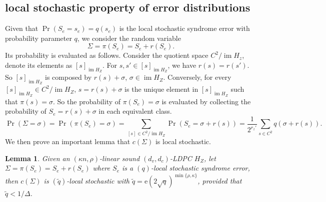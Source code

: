 \documentclass[twoside,english,aps,showpacs,pra,superscriptaddress]{revtex4-2}
\newcommand{\e}{\mathrm{e}}
\DeclareMathOperator{\im}{im}
\newtheorem{lemma}{Lemma}
\begin{document}
\subsection{local stochastic property of error distributions}
Given that $\Pr(S_e=s_e)=q(s_e)$ is the local stochastic syndrome error with probability parameter $q$, we consider the random variable 
\begin{equation}
    \Sigma = \pi(S_e) = S_e + r(S_e). 
\end{equation}
Its probability is evaluated as follows. Consider the quotient space $C^2/\im H_z$, denote its elements as $[s]_{\im H_Z}$. For $s,s' \in [s]_{\im H_Z}$, we have $r(s) = r(s')$.
So $[s]_{\im H_Z}$ is composed by $r(s) +\sigma$, $\sigma\in \im H_Z$. 
Conversely, for every $[s]_{\im H_Z} \in C^2/\im H_Z$, $s = r(s) +\sigma$ is the unique element in $[s]_{\im H_Z}$ such that $\pi(s) = \sigma$.
So the probability of $\pi(S_e) = \sigma$ is evaluated by collecting the probability of $S_e = r(s) +\sigma$ in each equivalent class.
\begin{equation}
    \Pr(\Sigma = \sigma)=\Pr(\pi(S_e) = \sigma) = \sum_{[s]\in C^2/\im H_Z} \Pr(S_e = \sigma + r(s)) = \frac{1}{2^{r_z'}} \sum_{s\in C^2}q(\sigma+r(s)).
\end{equation}
We then prove an important lemma that $c(\Sigma)$ is local stochastic.
\begin{lemma}
\label{lemma:local-stochastic-syndrome}
    Given an $(\kappa n,\rho)$-linear sound $(d_v,d_c)$-LDPC $H_Z$, let $\Sigma = \pi(S_e) = S_e + r(S_e)$ where $S_e$ is a $(q)$-local stochastic syndrome error, then $c(\Sigma)$ is $(\tilde{q})$-local stochastic with $\tilde{q} = \e (2\sqrt q)^{\min\{\rho, \kappa\} }$, provided that $\tilde{q} < 1/\Delta$.
\end{lemma}
\end{document}
